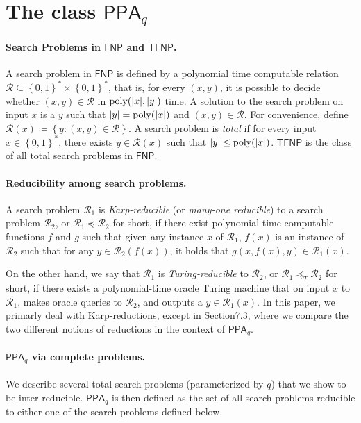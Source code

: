 \documentclass[10pt,a4paper]{article}
\theoremstyle{definition}
\theoremstyle{remark}
\def\set#1{\left\{#1\right\}}
\newcommand{\calR}{\mathcal{R}}
\newcommand{\bit}{\ensuremath{\set{0,1}}}
\DeclareMathOperator*{\poly}{\ensuremath\mathrm{poly}}
\newcommand{\class}[1]{\ensuremath{\mathsf{#1}}\xspace}
\newcommand{\FNP}{\class{FNP}}
\newcommand{\TFNP}{\class{TFNP}}
\newcommand{\PPA}{\class{PPA}}
\begin{document}
\setcounter{section}{1}
\setcounter{theorem}{5}
\section{\boldmath The class $\PPA_q$}
\label{sec:definitions}

\paragraph{\boldmath Search Problems in $\FNP$ and $\TFNP$.} A search problem
in $\FNP$ is defined by a polynomial time computable relation
$\calR\subseteq \bit^* \times \bit^*$, that is, for every $(x,y)$, it is
possible to decide whether $(x,y) \in \calR$ in $\poly(|x|, |y|)$ time. A
solution to the search problem on input $x$ is a $y$ such that
$|y| = \poly(|x|)$ and $(x,y) \in \calR$. For convenience, define
$\calR(x) \coloneqq \set{y : (x,y) \in \calR}$. A search problem is {\em total}
if for every input $x \in \bit^*$, there exists $y \in \calR(x)$ such that $|y|
\le \poly(|x|)$. $\TFNP$ is the class of all total search problems in $\FNP$.

\paragraph{Reducibility among search problems.} A search problem $\calR_1$ is
{\em Karp-reducible} (or {\em many-one reducible}) to a search problem
$\calR_2$, or $\calR_1 \preceq \calR_2$ for short, if there exist polynomial-time computable functions $f$ and $g$ such that given any instance $x$ of $\calR_1$, $f(x)$ is an instance of $\calR_2$ such that for any $y \in \calR_2(f(x))$, it holds that $g(x, f(x), y) \in \calR_1(x)$.

On the other hand, we say that $\calR_1$ is {\em Turing-reducible} to $\calR_2$, or $\calR_1 \preceq_T \calR_2$ for short, if there exists a polynomial-time oracle Turing machine that on input $x$ to $\calR_1$, makes oracle queries to $\calR_2$, and outputs a $y \in \calR_1(x)$. In this paper, we primarly deal with Karp-reductions, except in Section7.3, where we compare the two different notions of reductions in the context of $\PPA_q$.

\paragraph{\boldmath $\PPA_q$ via complete problems.} We describe several total search problems (parameterized by $q$) that we show to be inter-reducible. $\PPA_q$ is then defined as the set of all search problems reducible to either one of the search problems defined below.
\end{document}
